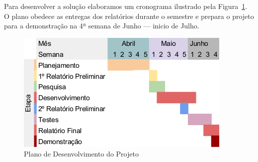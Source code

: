 Para desenvolver a solução elaboramos um cronograma ilustrado pela Figura~\ref{fig:plano}. O plano obedece as entregas dos relatórios durante o semestre e prepara o projeto para a demonstração na 4ª semana de Junho --- inicio de Julho.

\begin{figure}[!htpb]
    \centering
    \includegraphics{figs/plano.png}
    \caption{Plano de Desenvolvimento do Projeto}
    \label{fig:plano}
\end{figure}